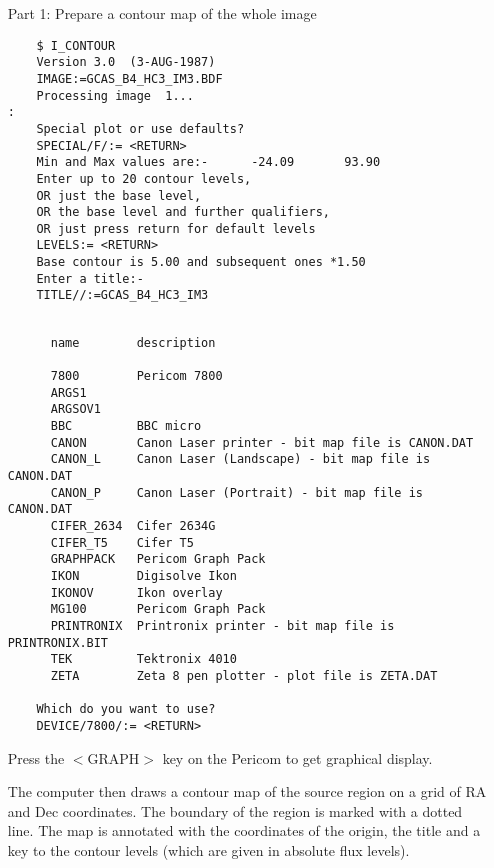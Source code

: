 \begin{itemize}
\item [Part 1:] Prepare a contour map of the whole image
\begin{verbatim}
    $ I_CONTOUR
    Version 3.0  (3-AUG-1987)     
    IMAGE:=GCAS_B4_HC3_IM3.BDF
    Processing image  1...                                                   :
    Special plot or use defaults?
    SPECIAL/F/:= <RETURN>
    Min and Max values are:-      -24.09       93.90                             
    Enter up to 20 contour levels,                                               
    OR just the base level,
    OR the base level and further qualifiers,
    OR just press return for default levels
    LEVELS:= <RETURN>
    Base contour is 5.00 and subsequent ones *1.50                                
    Enter a title:-
    TITLE//:=GCAS_B4_HC3_IM3
\end{verbatim}
\pagebreak
\begin{verbatim}

      name        description

      7800        Pericom 7800                                              
      ARGS1                                                                 
      ARGSOV1                                                               
      BBC         BBC micro                                                 
      CANON       Canon Laser printer - bit map file is CANON.DAT           
      CANON_L     Canon Laser (Landscape) - bit map file is CANON.DAT       
      CANON_P     Canon Laser (Portrait) - bit map file is CANON.DAT        
      CIFER_2634  Cifer 2634G                                               
      CIFER_T5    Cifer T5                                                  
      GRAPHPACK   Pericom Graph Pack                                        
      IKON        Digisolve Ikon                                            
      IKONOV      Ikon overlay                                              
      MG100       Pericom Graph Pack                                        
      PRINTRONIX  Printronix printer - bit map file is PRINTRONIX.BIT       
      TEK         Tektronix 4010                                            
      ZETA        Zeta 8 pen plotter - plot file is ZETA.DAT                
 
    Which do you want to use?
    DEVICE/7800/:= <RETURN>
\end{verbatim}
Press the $<$GRAPH$>$ key on the Pericom to get graphical display.

The computer then draws a contour map of the source region on a grid of RA and
Dec coordinates. The boundary of the region is marked with a dotted line. The
map is annotated with the coordinates of the origin, the title and a key to
the contour levels (which are given in absolute flux levels).


\end{itemize}
